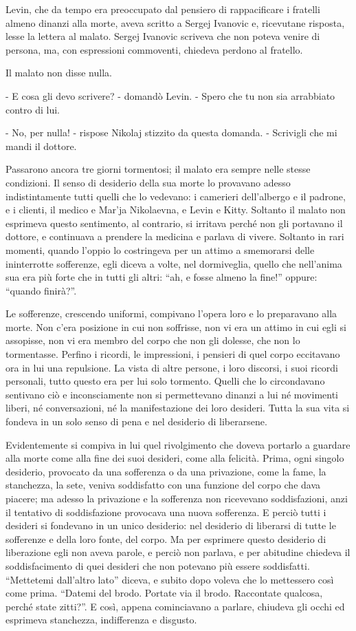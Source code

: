 Levin, che da tempo era preoccupato dal pensiero di rappacificare i fratelli almeno dinanzi alla morte, aveva scritto a Sergej Ivanovic e, ricevutane risposta, lesse la lettera al malato. Sergej Ivanovic scriveva che non poteva venire di persona, ma, con espressioni commoventi, chiedeva perdono al fratello. 

Il malato non disse nulla. 

- E cosa gli devo scrivere? - domandò Levin. - Spero che tu non sia arrabbiato contro di lui. 

- No, per nulla! - rispose Nikolaj stizzito da questa domanda. - Scrivigli che mi mandi il dottore. 

Passarono ancora tre giorni tormentosi; il malato era sempre nelle stesse condizioni. Il senso di desiderio della sua morte lo provavano adesso indistintamente tutti quelli che lo vedevano: i camerieri dell'albergo e il padrone, e i clienti, il medico e Mar'ja Nikolaevna, e Levin e Kitty. Soltanto il malato non esprimeva questo sentimento, al contrario, si irritava perché non gli portavano il dottore, e continuava a prendere la medicina e parlava di vivere. Soltanto in rari momenti, quando l'oppio lo costringeva per un attimo a smemorarsi delle ininterrotte sofferenze, egli diceva a volte, nel dormiveglia, quello che nell'anima sua era più forte che in tutti gli altri: ``ah, e fosse almeno la fine!'' oppure: ``quando finirà?''. 

Le sofferenze, crescendo uniformi, compivano l'opera loro e lo preparavano alla morte. Non c'era posizione in cui non soffrisse, non vi era un attimo in cui egli si assopisse, non vi era membro del corpo che non gli dolesse, che non lo tormentasse. Perfino i ricordi, le impressioni, i pensieri di quel corpo eccitavano ora in lui una repulsione. La vista di altre persone, i loro discorsi, i suoi ricordi personali, tutto questo era per lui solo tormento. Quelli che lo circondavano sentivano ciò e inconsciamente non si permettevano dinanzi a lui né movimenti liberi, né conversazioni, né la manifestazione dei loro desideri. Tutta la sua vita si fondeva in un solo senso di pena e nel desiderio di liberarsene. 

Evidentemente si compiva in lui quel rivolgimento che doveva portarlo a guardare alla morte come alla fine dei suoi desideri, come alla felicità. Prima, ogni singolo desiderio, provocato da una sofferenza o da una privazione, come la fame, la stanchezza, la sete, veniva soddisfatto con una funzione del corpo che dava piacere; ma adesso la privazione e la sofferenza non ricevevano soddisfazioni, anzi il tentativo di soddisfazione provocava una nuova sofferenza. E perciò tutti i desideri si fondevano in un unico desiderio: nel desiderio di liberarsi di tutte le sofferenze e della loro fonte, del corpo. Ma per esprimere questo desiderio di liberazione egli non aveva parole, e perciò non parlava, e per abitudine chiedeva il soddisfacimento di quei desideri che non potevano più essere soddisfatti. ``Mettetemi dall'altro lato'' diceva, e subito dopo voleva che lo mettessero così come prima. ``Datemi del brodo. Portate via il brodo. Raccontate qualcosa, perché state zitti?''. E così, appena cominciavano a parlare, chiudeva gli occhi ed esprimeva stanchezza, indifferenza e disgusto. 

